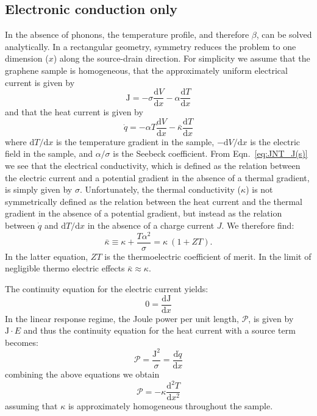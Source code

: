 \subsection{Electronic conduction only}
In the absence of phonons, the temperature profile, and therefore $\beta$, can be solved analytically. In a rectangular geometry, symmetry reduces the problem to one dimension ($x$) along the source-drain direction. For simplicity we assume that the graphene sample is homogeneous, that the approximately uniform electrical current is given by 
\begin{equation}\label{eq:JNT_J(s)}
\mathrm{J} = -\sigma \frac{\mathrm{d}V}{\mathrm{d}x} - \alpha \frac{\mathrm{d}T}{\mathrm{d}x}
\end{equation}
and that the heat current is given by 
\begin{equation}\label{eq:JNT_q(k)}
\dot{q} = -\alpha T\frac{\mathrm{d}V}{\mathrm{d}x} - \bar\kappa \frac{\mathrm{d}T}{\mathrm{d}x}
\end{equation}
where $\mathrm{d}T/\mathrm{d}x$ is the temperature gradient in the sample, $-\mathrm{d}V/\mathrm{d}x$ is the electric field in the sample, and $\alpha/\sigma$ is the Seebeck coefficient. From Eqn.~\ref{eq:JNT_J(s)} we see that the electrical conductivity, which is defined as the relation between the electric current and a potential gradient in the absence of a thermal gradient, is simply given by $\sigma$. Unfortunately, the thermal conductivity ($\kappa$) is not symmetrically defined as the relation between the heat current and the thermal gradient in the absence of a potential gradient, but instead as the relation between $\dot q$ and $\mathrm{d}T/\mathrm{d}x$ in the absence of a charge current $J$. We therefore find:
\begin{equation}
\bar\kappa \equiv \kappa + \frac{T\alpha^2}{\sigma} = \kappa~(1+ZT).
\end{equation}
In the latter equation,  $ZT$ is the thermoelectric coefficient of merit. In the limit of negligible thermo electric effects $\bar\kappa\approx\kappa$. 

The continuity equation for the electric current yields:
\begin{equation}\label{eq:1Dconduction_contJ}
0 = \frac{\mathrm{d}\mathrm{J}}{\mathrm{d}x}
\end{equation}
In the linear response regime, the Joule power per unit length, $\mathcal{P}$, is given by $\mathrm{J}\cdot E$ and thus the continuity equation for the heat current with a source term becomes:
\begin{equation}\label{eq:1Dconduction_contq}
\mathcal{P} = \frac{\mathrm{J}^2}{\sigma} =  \frac{\mathrm{d}\dot{q}}{\mathrm{d}x}
\end{equation}
combining the above equations we obtain 
\begin{equation}\label{eq:1Dconduction_diffeq}
\mathcal{P} = -\kappa \frac{\mathrm{d}^2 T}{\mathrm{d}x^2}
\end{equation}
assuming that $\kappa$ is approximately homogeneous throughout the sample.

